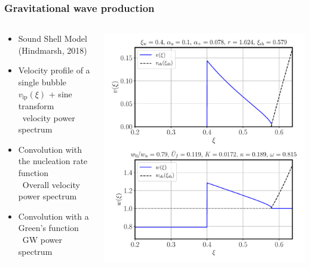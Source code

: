 \begin{frame}
    \frametitle{Gravitational wave production}
    \begin{columns}
    \begin{column}{0.4\textwidth}
        \begin{itemize}
            \item Sound Shell Model (Hindmarsh, 2018)
            \item Velocity profile of a single bubble $v_\text{ip}(\xi)$ + sine transform \\
                \textrightarrow \ velocity power spectrum
            \item Convolution with the nucleation rate function \\
                \textrightarrow \ Overall velocity power spectrum
            \item Convolution with a Green's function \textrightarrow \ GW power spectrum
        \end{itemize}
    \end{column}
    \begin{column}{0.3\textwidth}
        \includegraphics[width=\textwidth]{../fig/shell_plot_vw_04_alphan_01_review}

\end{column}
\end{columns}
\end{frame}
